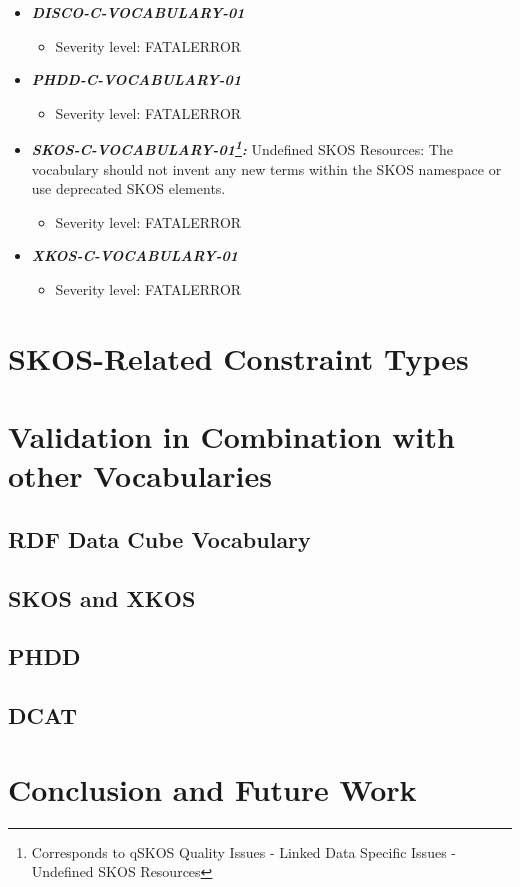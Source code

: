 \documentclass{llncs}
\begin{document}
\begin{itemize}
	\item \textbf{\em DISCO-C-VOCABULARY-01} 
	\begin{itemize}
		\item Severity level: FATALERROR
	\end{itemize}
\end{itemize}

\begin{itemize}
	\item \textbf{\em PHDD-C-VOCABULARY-01} 
	\begin{itemize}
		\item Severity level: FATALERROR
	\end{itemize}
\end{itemize}

\begin{itemize}
	\item \textbf{{\em SKOS-C-VOCABULARY-01\footnote{Corresponds to qSKOS Quality Issues - Linked Data Specific Issues - Undefined SKOS Resources}:}}
	Undefined SKOS Resources:
	The vocabulary should not invent any new terms within the SKOS namespace or use deprecated SKOS elements. 
	\begin{itemize}
		\item Severity level: FATALERROR
	\end{itemize}
\end{itemize}

\begin{itemize}
	\item \textbf{\em XKOS-C-VOCABULARY-01} 
	\begin{itemize}
		\item Severity level: FATALERROR
	\end{itemize}
\end{itemize}

\section{SKOS-Related Constraint Types}

\section{Validation in Combination with other Vocabularies}

\subsection{RDF Data Cube Vocabulary}

\subsection{SKOS and XKOS}

\subsection{PHDD}

\subsection{DCAT}

\section{Conclusion and Future Work}

{}

\setcounter{tocdepth}{1}
\end{document}
